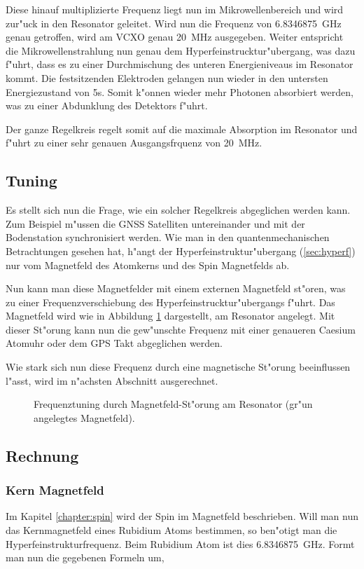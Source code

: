 \begin{refsection}
Diese hinauf multiplizierte Frequenz liegt nun im Mikrowellenbereich
und wird zur"uck in den Resonator geleitet.  Wird nun die Frequenz von
\SI{6.8346875}{\giga\hertz} genau getroffen, wird am VCXO genau
\SI{20}{\mega\hertz} ausgegeben.  Weiter entspricht die
Mikrowellenstrahlung nun genau dem Hyperfeinstrucktur"ubergang, was
dazu f"uhrt, dass es zu einer Durchmischung des unteren Energieniveaus
im Resonator kommt.  Die festsitzenden Elektroden gelangen nun wieder
in den untersten Energiezustand von 5s.  Somit k"onnen wieder mehr
Photonen absorbiert werden, was zu einer Abdunklung des Detektors
f"uhrt.

Der ganze Regelkreis regelt somit auf die maximale Absorption im
Resonator und f"uhrt zu einer sehr genauen Ausgangsfrquenz von
\SI{20}{\mega\hertz}.

\subsection{Tuning}
Es stellt sich nun die Frage, wie ein solcher Regelkreis abgeglichen
werden kann.  Zum Beispiel m"ussen die GNSS Satelliten untereinander
und mit der Bodenstation synchronisiert werden.  Wie man in den
quantenmechanischen Betrachtungen gesehen hat, h"angt der
Hyperfeinstruktur"ubergang (\ref{sec:hyperf}) nur vom Magnetfeld des
Atomkerns und des Spin Magnetfelds ab.

Nun kann man diese Magnetfelder mit einem externen Magnetfeld st"oren,
was zu einer Frequenzverschiebung des Hyperfeinstrucktur"ubergangs
f"uhrt.  Das Magnetfeld wird wie in Abbildung \ref{fig:tuning}
dargestellt, am Resonator angelegt.  Mit dieser St"orung kann nun die
gew"unschte Frequenz mit einer genaueren Caesium Atomuhr oder dem GPS
Takt abgeglichen werden.

Wie stark sich nun diese Frequenz durch eine magnetische St"orung
beeinflussen l"asst, wird im n"achsten Abschnitt ausgerechnet.

\begin{figure}
  \centering
  
  \caption{Frequenztuning durch Magnetfeld-St"orung am Resonator
    (gr"un angelegtes Magnetfeld).}
  \label{fig:tuning}
\end{figure}

\subsection{Rechnung}

\subsubsection{Kern Magnetfeld}
Im Kapitel \ref{chapter:spin} wird der Spin im Magnetfeld beschrieben.
Will man nun das Kernmagnetfeld eines Rubidium Atoms bestimmen, so
ben"otigt man die Hyperfeinstrukturfrequenz.  Beim Rubidium Atom ist
dies \SI{6.8346875}{\giga\hertz}.  Formt man nun die gegebenen Formeln
um,


\end{refsection}
